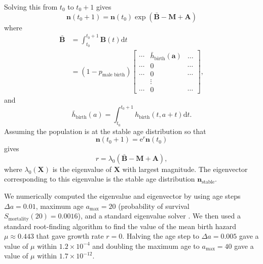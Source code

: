 \documentclass[12pt]{article}
\renewcommand{\vec}[1]{\mathbf{#1}}
\newcommand{\mat}[1]{\mathbf{#1}}
\newcommand{\md}{\mathrm{d}}
\newcommand{\me}{\mathrm{e}}
\begin{document}
Solving this from $t_0$ to $t_0 + 1$ gives
\begin{equation}
  \vec{n}(t_0 + 1) = \vec{n}(t_0)
  \exp\left(\bar{\mat{B}} - \mat{M} + \mat{A}\right)
\end{equation}
where
\begin{equation}
  \begin{split}
    \bar{\mat{B}} &=
    \int_{t_0}^{t_0 + 1} \mat{B}(t) \md t\\
    &=
    (1 - p_{\text{male birth}})
    \begin{bmatrix}
      \cdots & \bar{h}_{\text{birth}}(\vec{a}) & \dots
      \\
      \cdots & 0 & \cdots
      \\
      \cdots & 0 & \cdots
      \\
      & \vdots &
      \\
      \cdots & 0 & \cdots
    \end{bmatrix},
  \end{split}
\end{equation}
and
\begin{equation}
  \bar{h}_{\text{birth}}(a) =
  \int_{t_0}^{t_0 + 1} h_{\text{birth}}(t, a + t) \md t.
\end{equation}
Assuming the population is at the stable age distribution so that
\begin{equation}
  \vec{n}(t_0 + 1) = \me^r \vec{n}(t_0)
\end{equation}
gives
\begin{equation}
  r = \lambda_0\left(\bar{\mat{B}} - \mat{M} + \mat{A}\right),
\end{equation}
where $\lambda_0(\mat{X})$ is the eigenvalue of $\mat{X}$ with largest
magnitude.  The eigenvector corresponding to this eigenvalue is the
stable age distribution $\vec{n}_{\text{stable}}$.

We numerically computed the eigenvalue and eigenvector by using age
steps $\Delta a = 0.01$, maximum age $a_{\text{max}} = 20$
(probability of survival $S_{\text{mortality}}(20) = 0.0016$), and a
standard eigenvalue solver
\citep[\texttt{scipy.sparse.linalg.eigs},][]{scipy}.  We then used a
standard root-finding algorithm
\citep[\texttt{scipy.optimize.fsolve},][]{scipy} to find the value of
the mean birth hazard $\mu \approx 0.443$ that gave growth rate
$r = 0$.  Halving the age step to $\Delta a = 0.005$ gave a value of
$\mu$ within $1.2 \times 10^{-4}$ and doubling the maximum age to
$a_{\text{max}} = 40$ gave a value of $\mu$ within
$1.7 \times 10^{-12}$.
\end{document}
